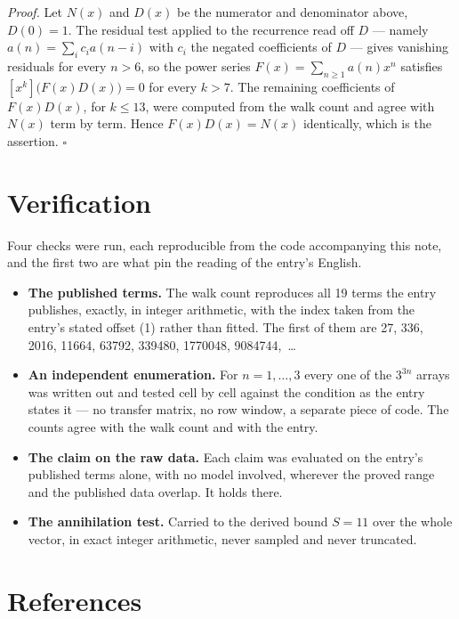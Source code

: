 \documentclass[11pt]{article}
\theoremstyle{definition}
\begin{document}
{\itshape Proof.} Let $N(x)$ and $D(x)$ be the numerator and denominator above, $D(0)=1$. The residual test applied to the recurrence read off $D$ --- namely $a(n) = \sum_i c_i a(n-i)$ with $c_i$ the negated coefficients of $D$ --- gives vanishing residuals for every $n > 6$, so the power series $F(x)=\sum_{n\ge 1}a(n)x^n$ satisfies $[x^k]\bigl(F(x)D(x)\bigr) = 0$ for every $k > 7$. The remaining coefficients of $F(x)D(x)$, for $k \le 13$, were computed from the walk count and agree with $N(x)$ term by term. Hence $F(x)D(x) = N(x)$ identically, which is the assertion. $\square$

\section{Verification}

Four checks were run, each reproducible from the code accompanying this note, and the first two are what pin the reading of the entry's English.

\begin{itemize}

\item {\bfseries The published terms.} The walk count reproduces all 19 terms the entry publishes, exactly, in integer arithmetic, with the index taken from the entry's stated offset (1) rather than fitted. The first of them are 27, 336, 2016, 11664, 63792, 339480, 1770048, 9084744,~\dots

\item {\bfseries An independent enumeration.} For $n = 1,\dots,3$ every one of the $3^{3n}$ arrays was written out and tested cell by cell against the condition as the entry states it --- no transfer matrix, no row window, a separate piece of code. The counts agree with the walk count and with the entry.

\item {\bfseries The claim on the raw data.} Each claim was evaluated on the entry's published terms alone, with no model involved, wherever the proved range and the published data overlap. It holds there.

\item {\bfseries The annihilation test.} Carried to the derived bound $S = 11$ over the whole vector, in exact integer arithmetic, never sampled and never truncated.

\end{itemize}

\section{References}
\end{document}
